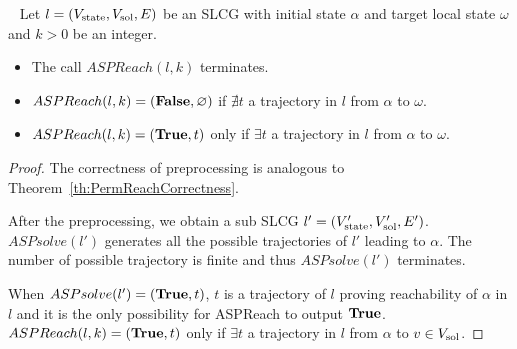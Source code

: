 \begin{theorem}\label{th:ASPReachCorrectness} ~
    Let $l=(V_{\mathrm{state}}, V_{\mathrm{sol}}, E)$ be an SLCG with initial state $\alpha$ and target local state $\omega$ and $k > 0$ be an integer.
    \begin{itemize}
        \item The call $ASPReach(l,k)$ terminates.
        \item $ASPReach(l,k)=(\mathbf{False},\varnothing)$ if $\nexists t$ a trajectory in $l$ from $\alpha$ to $\omega$.
        \item $ASPReach(l,k)=(\mathbf{True},t)$ only if $\exists t$ a trajectory in $l$ from $\alpha$ to $\omega$.
    \end{itemize}
    
    \begin{proof}
    
        The correctness of preprocessing is analogous to Theorem~\ref{th:PermReachCorrectness}.
        
        After the preprocessing, we obtain a sub SLCG $l'=(V'_{\mathrm{state}}, V'_{\mathrm{sol}}, E')$.
        $ASPsolve(l')$ generates all the possible trajectories of $l'$ leading to $\alpha$.
        The number of possible trajectory is finite and thus $ASPsolve(l')$ terminates.
        
        When $ASPsolve(l')=(\mathbf{True},t)$, $t$ is a trajectory of $l$ proving reachability of $\alpha$ in $l$ and it is the only possibility for ASPReach to output $\mathbf{True}$.
        $ASPReach(l,k)=(\mathrm{\mathbf{True}},t)$ only if $\exists t$ a trajectory in $l$ from $\alpha$ to $v \in V_{\mathrm{sol}}$.
    \end{proof}
\end{theorem}


